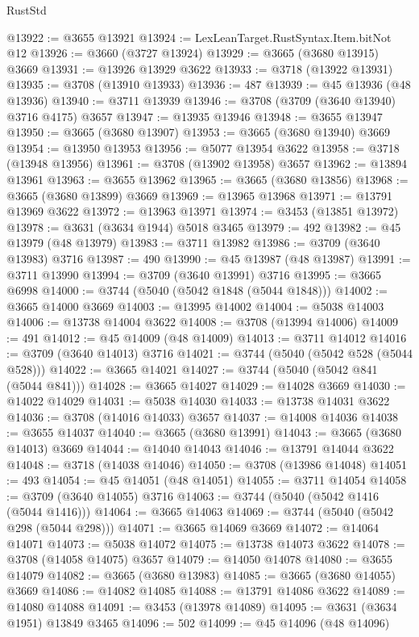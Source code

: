 \begin{lexlean}{RustStd}
\begin{coremodule}
@13922 := @3655 @13921
@13924 := LexLeanTarget.RustSyntax.Item.bitNot @12
@13926 := @3660 (@3727 @13924)
@13929 := @3665 (@3680 @13915) @3669
@13931 := @13926 @13929 @3622
@13933 := @3718 (@13922 @13931)
@13935 := @3708 (@13910 @13933)
@13936 := 487
@13939 := @45 @13936 (@48 @13936)
@13940 := @3711 @13939
@13946 := @3708 (@3709 (@3640 @13940) @3716 @4175) @3657
@13947 := @13935 @13946
@13948 := @3655 @13947
@13950 := @3665 (@3680 @13907)
@13953 := @3665 (@3680 @13940) @3669
@13954 := @13950 @13953
@13956 := @5077 @13954 @3622
@13958 := @3718 (@13948 @13956)
@13961 := @3708 (@13902 @13958) @3657
@13962 := @13894 @13961
@13963 := @3655 @13962
@13965 := @3665 (@3680 @13856)
@13968 := @3665 (@3680 @13899) @3669
@13969 := @13965 @13968
@13971 := @13791 @13969 @3622
@13972 := @13963 @13971
@13974 := @3453 (@13851 @13972)
@13978 := @3631 (@3634 @1944) @5018 @3465
@13979 := 492
@13982 := @45 @13979 (@48 @13979)
@13983 := @3711 @13982
@13986 := @3709 (@3640 @13983) @3716
@13987 := 490
@13990 := @45 @13987 (@48 @13987)
@13991 := @3711 @13990
@13994 := @3709 (@3640 @13991) @3716
@13995 := @3665 @6998
@14000 := @3744 (@5040 (@5042 @1848 (@5044 @1848)))
@14002 := @3665 @14000 @3669
@14003 := @13995 @14002
@14004 := @5038 @14003
@14006 := @13738 @14004 @3622
@14008 := @3708 (@13994 @14006)
@14009 := 491
@14012 := @45 @14009 (@48 @14009)
@14013 := @3711 @14012
@14016 := @3709 (@3640 @14013) @3716
@14021 := @3744 (@5040 (@5042 @528 (@5044 @528)))
@14022 := @3665 @14021
@14027 := @3744 (@5040 (@5042 @841 (@5044 @841)))
@14028 := @3665 @14027
@14029 := @14028 @3669
@14030 := @14022 @14029
@14031 := @5038 @14030
@14033 := @13738 @14031 @3622
@14036 := @3708 (@14016 @14033) @3657
@14037 := @14008 @14036
@14038 := @3655 @14037
@14040 := @3665 (@3680 @13991)
@14043 := @3665 (@3680 @14013) @3669
@14044 := @14040 @14043
@14046 := @13791 @14044 @3622
@14048 := @3718 (@14038 @14046)
@14050 := @3708 (@13986 @14048)
@14051 := 493
@14054 := @45 @14051 (@48 @14051)
@14055 := @3711 @14054
@14058 := @3709 (@3640 @14055) @3716
@14063 := @3744 (@5040 (@5042 @1416 (@5044 @1416)))
@14064 := @3665 @14063
@14069 := @3744 (@5040 (@5042 @298 (@5044 @298)))
@14071 := @3665 @14069 @3669
@14072 := @14064 @14071
@14073 := @5038 @14072
@14075 := @13738 @14073 @3622
@14078 := @3708 (@14058 @14075) @3657
@14079 := @14050 @14078
@14080 := @3655 @14079
@14082 := @3665 (@3680 @13983)
@14085 := @3665 (@3680 @14055) @3669
@14086 := @14082 @14085
@14088 := @13791 @14086 @3622
@14089 := @14080 @14088
@14091 := @3453 (@13978 @14089)
@14095 := @3631 (@3634 @1951) @13849 @3465
@14096 := 502
@14099 := @45 @14096 (@48 @14096)

\end{coremodule}
\end{lexlean}

